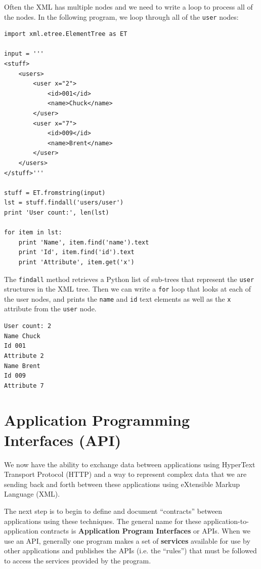 \documentclass[11pt]{book}
\begin{document}
Often the XML has multiple nodes and we need to write a loop
to process all of the nodes.  In the following program, 
we loop through all of the {\tt user} nodes:

\beforeverb
\begin{verbatim}
import xml.etree.ElementTree as ET

input = '''
<stuff>
    <users>
        <user x="2">
            <id>001</id>
            <name>Chuck</name>
        </user>
        <user x="7">
            <id>009</id>
            <name>Brent</name>
        </user>
    </users>
</stuff>'''

stuff = ET.fromstring(input)
lst = stuff.findall('users/user')
print 'User count:', len(lst)

for item in lst:
    print 'Name', item.find('name').text
    print 'Id', item.find('id').text
    print 'Attribute', item.get('x')
\end{verbatim}
\afterverb
%
The {\tt findall} method retrieves a Python list of sub-trees that
represent the {\tt user} structures in the XML tree.  Then we can 
write a {\tt for} loop that looks at each of the user nodes, and 
prints the {\tt name} and {\tt id} text elements as well as the 
{\tt x} attribute from the {\tt user} node.

\beforeverb
\begin{verbatim}
User count: 2
Name Chuck
Id 001
Attribute 2
Name Brent
Id 009
Attribute 7
\end{verbatim}
\afterverb
%

\section{Application Programming Interfaces (API)}

We now have the ability to exchange data between applications using HyperText
Transport Protocol (HTTP) and a way to represent complex data that we are 
sending back and forth between these applications using eXtensible 
Markup Language (XML).

The next step is to begin to define and document ``contracts'' between 
applications using these techniques. The general name for these 
application-to-application contracts is {\bf Application Program 
Interfaces} or APIs.  When we use an API, generally one program
makes a set of {\bf services} available for use by other applications
and publishes the APIs (i.e. the ``rules'') that must be followed to 
access the services provided by the program.
\end{document}
